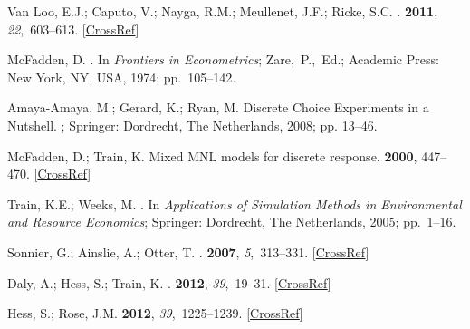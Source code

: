 \documentclass[sustainability,article,accept,moreauthors,pdftex,10pt,a4paper]{Definitions/mdpi}
\theoremstyle{mdpi}
\newcounter{ex}
\newcounter{re}
\theoremstyle{mdpidefinition}
\begin{document}
{\begin{thebibliography}{999}
{Van Loo}, E.J.; Caputo, V.; Nayga, R.M.; Meullenet, J.F.; Ricke, S.C.
.
 {\bf 2011}, {\em 22},~603--613. [\href{http://dx.doi.org/10.1016/j.foodqual.2011.02.003}{CrossRef}]

McFadden, D.
.
\newblock In {\em Frontiers in Econometrics};  \mbox{Zare, P., Ed}.; Academic Press:  New York, NY, USA, {
1974}; pp.~105--142.

Amaya-Amaya, M.; Gerard, K.; Ryan, M. Discrete Choice Experiments in a
Nutshell.
; Springer: Dordrecht, The Netherlands, 2008; pp. 13--46.

McFadden, D.; Train, K.
\newblock Mixed MNL models for discrete response.
 {\bf 2000},  447--470. [\href{http://dx.doi.org/10.1002/1099-1255(200009/10)15:5<447::AID-JAE570>3.0.CO;2-1}{CrossRef}]

Train, K.E.; Weeks, M.
.
\newblock In {\em Applications of Simulation Methods in Environmental and Resource
Economics}; Springer: Dordrecht, The Netherlands,  {2005}; pp.~1--16.

Sonnier, G.; Ainslie, A.; Otter, T.
.
 {\bf 2007}, {\em
5},~313--331. [\href{http://dx.doi.org/10.1007/s11129-007-9024-6}{CrossRef}]

Daly, A.; Hess, S.; Train, K.
.
 {\bf 2012}, {\em 39},~19--31. [\href{http://dx.doi.org/10.1007/s11116-011-9331-3}{CrossRef}]

Hess, S.; Rose, J.M.
 {\bf 2012}, {\em 39},~1225--1239. [\href{http://dx.doi.org/10.1007/s11116-012-9394-9}{CrossRef}]


\end{thebibliography}}
\end{document}
